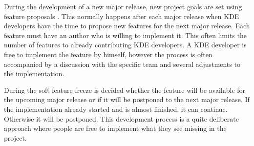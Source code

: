 During the development of a new major release, new project goals are set using
feature proposals \cite{KDEDevelopmentModel,KDEFAQ}. This normally happens
after each major release when KDE developers have the time to propose new
features for the next major release. Each feature must have an author who is
willing to implement it. This often limits the number of features to already
contributing KDE developers. A KDE developer is free to implement the feature
by himself, however the process is often accompanied by a discussion with the
specific team and several adjustments to the implementation.

During the soft feature freeze is decided whether the feature will be available
for the upcoming major release or if it will be postponed to the next major
release. If the implementation already started and is almost finished, it can
continue. Otherwise it will be postponed. This development process is a quite
deliberate approach where people are free to implement what they see missing in
the project.


